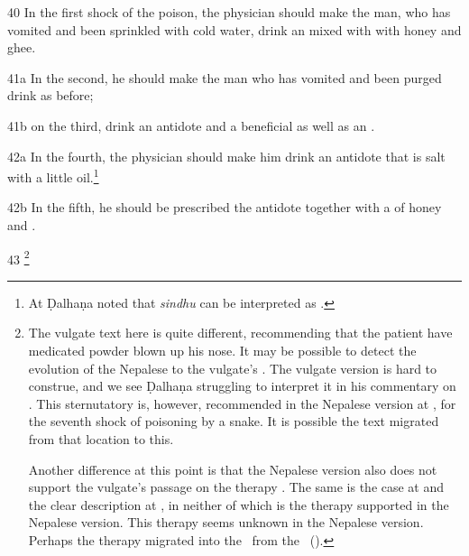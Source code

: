 \begin{translation}
    \item[40] In the first shock of the poison, the physician should make the man,
who has vomited and been sprinkled with cold water, drink an
 mixed with with honey and ghee.
    
    \item[41a] In the second, he should make the man who has vomited and been
purged drink as before;
    
    \item[41b]
    on the third, drink an antidote and a beneficial
     as well as an .
    
    
    \item[42a] In the fourth, the physician should make him drink an antidote that
is salt with a little oil.\footnote{At  Ḍalhaṇa noted that
\emph{sindhu} can be interpreted as .}
    
    

    
    \item[42b]
    In the fifth, he should be prescribed the antidote together with a
     of honey and
    .
   
   
    \item[43] 
    \footnote{The vulgate text here is quite
different, recommending that the patient have medicated powder blown up his nose.
It may be possible to detect the evolution of the Nepalese  to the
vulgate's .  The vulgate version is hard to construe, and we see
Ḍalhaṇa struggling to interpret it in his commentary on .  This
sternutatory is, however, recommended in the Nepalese version at
, for the seventh shock of poisoning by a  snake.  It is possible the text migrated from  that location to
this.

Another difference at this point is that the Nepalese version also does not
support the vulgate's passage on the  therapy
\citep[145, n.\,106]{wuja-2003}.  The same is the case at  and the
clear description at , in neither of which is the therapy
supported in the Nepalese version.  This therapy seems unknown in the Nepalese
version.  Perhaps the therapy migrated into the \SS\ from the \CS\
().}
    

\end{translation}
